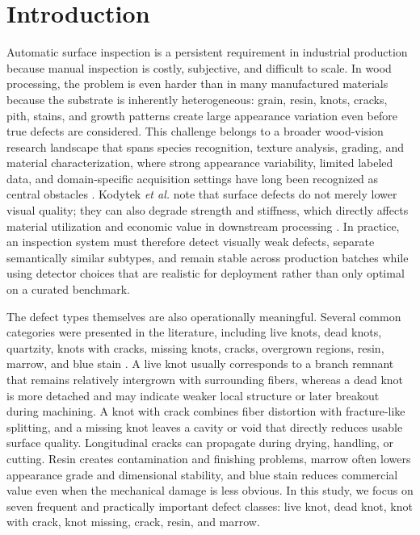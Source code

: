 \documentclass[10pt,a4paper]{article}
\begin{document}
\section{Introduction}
\label{sec:introduction}

Automatic surface inspection is a persistent requirement in industrial production because manual inspection is costly, subjective, and difficult to scale. In wood processing, the problem is even harder than in many manufactured materials because the substrate is inherently heterogeneous: grain, resin, knots, cracks, pith, stains, and growth patterns create large appearance variation even before true defects are considered. This challenge belongs to a broader wood-vision research landscape that spans species recognition, texture analysis, grading, and material characterization, where strong appearance variability, limited labeled data, and domain-specific acquisition settings have long been recognized as central obstacles \citep{hwang_sugiyama_review,da_silva_2017,souza_2020,de_geus_2021,kirbas_2022,he_2021_woodresearch,herrera_poyatos_2024}. Kodytek \textit{et al.} note that surface defects do not merely lower visual quality; they can also degrade strength and stiffness, which directly affects material utilization and economic value in downstream processing \citep{kodytek_dataset}. In practice, an inspection system must therefore detect visually weak defects, separate semantically similar subtypes, and remain stable across production batches while using detector choices that are realistic for deployment rather than only optimal on a curated benchmark.

The defect types themselves are also operationally meaningful. Several common categories were presented in the literature, including live knots, dead knots, quartzity, knots with cracks, missing knots, cracks, overgrown regions, resin, marrow, and blue stain \citep{kodytek_dataset}. A live knot usually corresponds to a branch remnant that remains relatively intergrown with surrounding fibers, whereas a dead knot is more detached and may indicate weaker local structure or later breakout during machining. A knot with crack combines fiber distortion with fracture-like splitting, and a missing knot leaves a cavity or void that directly reduces usable surface quality. Longitudinal cracks can propagate during drying, handling, or cutting. Resin creates contamination and finishing problems, marrow often lowers appearance grade and dimensional stability, and blue stain reduces commercial value even when the mechanical damage is less obvious. In this study, we focus on seven frequent and practically important defect classes: live knot, dead knot, knot with crack, knot missing, crack, resin, and marrow. 
\end{document}
